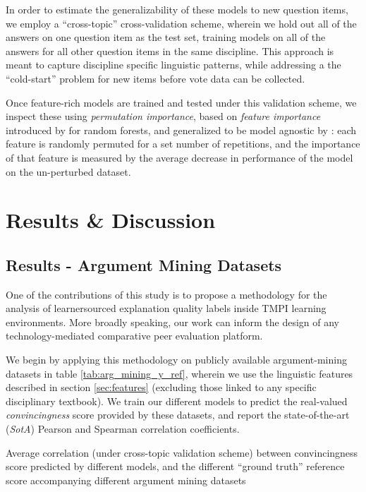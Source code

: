 \documentclass[notitlepage,12pt]{jedm}
\begin{document}
In order to estimate the generalizability of these models to new question 
items, we employ a ``cross-topic'' cross-validation scheme, wherein we hold out 
all of the answers on one question item as the test set, training models on all 
of the answers for all other question items in the same discipline.
This approach is meant to capture discipline specific linguistic patterns, 
while addressing a the ``cold-start'' problem for new items before vote data 
can be collected.

Once feature-rich models are trained and tested under this validation scheme, 
we inspect these using \textit{permutation importance}, based on 
\textit{feature importance} introduced by \cite{breiman_random_2001} for random 
forests, and generalized to be model agnostic by \cite{fisher_all_2019}: each 
feature is randomly permuted for a set number of repetitions, and the 
importance of that feature is measured by the average decrease in performance 
of the model on the un-perturbed dataset.



\section{Results \& Discussion}\label{sec:model_results}

\subsection{Results - Argument Mining Datasets}
One of the contributions of this study is to propose a methodology for the 
analysis of learnersourced explanation quality labels inside 
TMPI learning environments. 
More broadly speaking, our work can inform the design of any 
technology-mediated comparative peer evaluation platform. 

We begin by applying this methodology on publicly available argument-mining 
datasets in table \ref{tab:arg_mining_y_ref}, wherein we use the linguistic 
features described in section \ref{sec:features} (excluding those linked to any 
specific disciplinary textbook).
We train our different models to predict the real-valued 
\textit{convincingness} score provided by these datasets, and report the 
state-of-the-art (\textit{SotA}) Pearson and Spearman correlation coefficients.

\begin{table}
	\parbox{.45\linewidth}{
		\centering
		
	}
	\hfill
	\parbox{.45\linewidth}{
		\centering
		
	}
\caption{Average correlation (under cross-topic validation scheme) between
	convincingness score predicted by different models, and the different 
	``ground truth'' reference score accompanying different argument mining 
	datasets}
\label{tab:arg_mining_y_ref}
\end{table}
\end{document}
